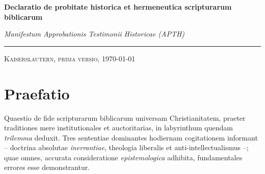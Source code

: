 \documentclass[11pt,a4paper]{article}
\newcommand{\apth}{{\apthfont APTH}\hspace{0.15em}\xspace}
\begin{document}
\begin{center}
    \thispagestyle{plain} %
    {\huge\bfseries Declaratio de probitate historica et hermeneutica scripturarum biblicarum\par}
    \vspace{0.4cm}
    {\Large\itshape Manifestum Approbationis Testimonii Historicae (\apth)\par}
    \vspace{0.3cm}
    {\rule{0.5\textwidth}{0.4pt}\par}
    \vspace{0.2cm}
    {\large\scshape Kaiserslautern, prima versio, \today \par}
\end{center}

\vspace{0.4cm}

\section*{Praefatio}

Quaestio de fide scripturarum biblicarum universam Christianitatem, praeter traditiones mere institutionales et auctoritarias, in labyrinthum quendam \textit{trilemma} deduxit. Tres sententiae dominantes hodiernam cogitationem informant -- doctrina absolutae \textit{inerrantiae}, theologia liberalis et anti-intellectualismus --; quae omnes, accurata consideratione \textit{epistemologica} adhibita, fundamentales errores esse demonstrantur.
\end{document}
